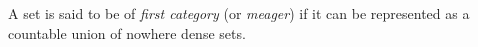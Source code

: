 A set is said to be of \textit{first category} (or \textit{meager}) if it can be represented as a countable union of nowhere dense sets.
